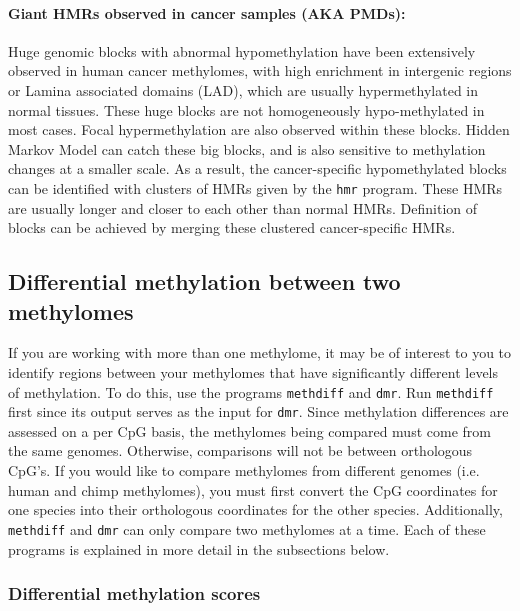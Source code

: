 \documentclass[10pt]{article}
\newcommand{\prog}[1]{\texttt{#1}}
\begin{document}
\paragraph{Giant HMRs observed in cancer samples (AKA PMDs):}
Huge genomic blocks with abnormal hypomethylation have been
extensively observed in human cancer methylomes, with high enrichment
in intergenic regions or Lamina associated domains (LAD), which are
usually hypermethylated in normal tissues. These huge blocks are not
homogeneously hypo-methylated in most cases. Focal hypermethylation
are also observed within these blocks.  Hidden Markov Model can catch
these big blocks, and is also sensitive to methylation changes at a
smaller scale. As a result, the cancer-specific hypomethylated blocks
can be identified with clusters of HMRs given by the \prog{hmr}
program.  These HMRs are usually longer and closer to each other than
normal HMRs.  Definition of blocks can be achieved by merging these
clustered cancer-specific HMRs.


\subsection{Differential methylation between two methylomes}
\label{sec:differential_methylation}

If you are working with more than one methylome, it may be of interest
to you to identify regions between your methylomes that have
significantly different levels of methylation. To do this, use the
programs \prog{methdiff} and \prog{dmr}. Run \prog{methdiff} first
since its output serves as the input for \prog{dmr}. Since methylation
differences are assessed on a per CpG basis, the methylomes being
compared must come from the same genomes. Otherwise, comparisons will
not be between orthologous CpG's. If you would like to compare
methylomes from different genomes (i.e. human and chimp methylomes),
you must first convert the CpG coordinates for one species into their
orthologous coordinates for the other species. Additionally,
\prog{methdiff} and \prog{dmr} can only compare two methylomes at a
time. Each of these programs is explained in more detail in the
subsections below.

\subsubsection{Differential methylation scores}
\label{sec:methdiff}
\end{document}

